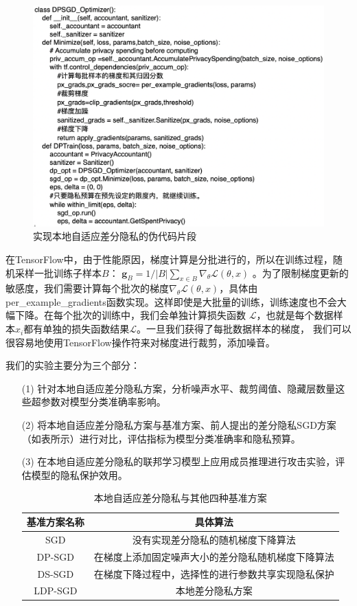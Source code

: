 \begin{figure}[!hbt]
\centering
	\includegraphics[scale=0.5]{fig2/C3/代码片段1}%
	\caption{实现本地自适应差分隐私的伪代码片段}
	\label{fig:实现本地自适应差分隐私的伪代码片段}	
\end{figure}

在TensorFlow中，由于性能原因，梯度计算是分批进行的，所以在训练过程，随机采样一批训练子样本$B$：
$\mathbf{g}_{B}=1 /|B| \sum_{x \in B} \nabla_{\theta} \mathcal{L}(\theta, x)$
。为了限制梯度更新的敏感度，我们需要计算每个批次的梯度$\nabla_{\theta} \mathcal{L}(\theta, x)$，具体由per\_example\_gradients函数实现。这样即使是大批量的训练，训练速度也不会大幅下降。在每个批次的训练中，我们会单独计算损失函数 
$\mathcal{L}$，也就是每个数据样本$x_{i}$都有单独的损失函数结果$\mathcal{L}$。一旦我们获得了每批数据样本的梯度，
我们可以很容易地使用TensorFlow操作符来对梯度进行裁剪，添加噪音。

我们的实验主要分为三个部分：
\begin{enumerate}
\item [(1)] 针对本地自适应差分隐私方案，分析噪声水平、裁剪阈值、隐藏层数量这些超参数对模型分类准确率影响。
\item [(2)] 将本地自适应差分隐私方案与基准方案、前人提出的差分隐私SGD方案（如表所示）进行对比，评估指标为模型分类准确率和隐私预算。
\item [(3)] 在本地自适应差分隐私的联邦学习模型上应用成员推理进行攻击实验，评估模型的隐私保护效用。

\begin{table}[H]
	\centering
	\begin{tabular}{cc}
		\hline
		基准方案名称& 具体算法\\
		\hline
		SGD& 没有实现差分隐私的随机梯度下降算法\\
		DP-SGD\upcite{ref57}& 在梯度上添加固定噪声大小的差分隐私随机梯度下降算法\\
		DS-SGD\upcite{ref67}& 在梯度下降过程中，选择性的进行参数共享实现隐私保护\\
		LDP-SGD& 本地差分隐私方案\\
		\hline
	\end{tabular}
	\caption{本地自适应差分隐私与其他四种基准方案}
	\label{tab1}
\end{table}

\end{enumerate}

